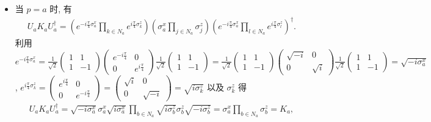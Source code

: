 \documentclass{assignment}
\begin{document}
\begin{pf}
    \begin{itemize}
        \item 当 $p=a$ 时, 有
        \begin{align}
            U_aK_aU_a^{\dagger}=\left(e^{-i\frac{\pi}{4}\sigma_a^x}\prod_{k\in N_a}e^{i\frac{\pi}{4}\sigma_k^z}\right)\left(\sigma_a^x\prod_{j\in N_a}\sigma_j^z\right)\left(e^{-i\frac{\pi}{4}\sigma_a^x}\prod_{l\in N_a}e^{i\frac{\pi}{4}\sigma_l^z}\right)^{\dagger}.
        \end{align}
        利用 $e^{-i\frac{\pi}{4}\sigma_a^x}=\frac{1}{\sqrt{2}}\begin{pmatrix}
            1&1\\
            1&-1
        \end{pmatrix}\begin{pmatrix}
            e^{-i\frac{\pi}{4}}&0\\
            0&e^{i\frac{\pi}{4}}
        \end{pmatrix}\frac{1}{\sqrt{2}}\begin{pmatrix}
            1&1\\
            1&-1
        \end{pmatrix}=\frac{1}{\sqrt{2}}\begin{pmatrix}
            1&1\\
            1&-1
        \end{pmatrix}\begin{pmatrix}
            \sqrt{-i}&0\\
            0&\sqrt{i}
        \end{pmatrix}\frac{1}{\sqrt{2}}\begin{pmatrix}
            1&1\\
            1&-1
        \end{pmatrix}=\sqrt{-i\sigma_a^x}$, $e^{i\frac{\pi}{4}\sigma_k^z}=\begin{pmatrix}
            e^{i\frac{\pi}{4}}&0\\
            0&e^{-i\frac{\pi}{4}}
        \end{pmatrix}=\begin{pmatrix}
            \sqrt{i}&0\\
            0&\sqrt{-i}
        \end{pmatrix}=\sqrt{i\sigma_k^z}$ 以及 $\sigma_k^z$ 得
        \begin{align}
            U_aK_aU_a^{\dagger}=\sqrt{-i\sigma_a^x}\sigma_a^x\sqrt{i\sigma_a^x}\prod_{b\in N_a}\sqrt{i\sigma_b^z}\sigma_b^z\sqrt{-i\sigma_b^z}=\sigma_a^x\prod_{b\in N_a}\sigma_b^z=K_a,

\end{align}
\end{itemize}
\end{pf}
\end{document}

